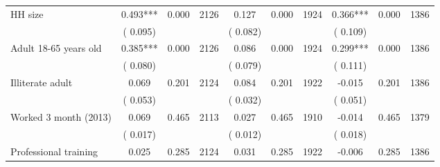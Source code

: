 \begin{tabular}{l*{9}{c}}
 HH size                 &              0.493***          &        0.000 & 2126          &              0.127 &        0.000 & 1924                   &        0.366*** &        0.000 & 1386                                 \\ 
                               &        (       0.095) & &                                                                 &       (       0.082) & &                                                          &       (       0.109) & &                                          \\ 
 Adult 18-65 years old                 &              0.385***          &        0.000 & 2126          &              0.086 &        0.000 & 1924                   &        0.299*** &        0.000 & 1386                                 \\ 
                               &        (       0.080) & &                                                                 &       (       0.079) & &                                                          &       (       0.111) & &                                          \\ 
 Illiterate adult                 &              0.069          &        0.201 & 2124          &              0.084 &        0.201 & 1922                   &       -0.015 &        0.201 & 1386                                 \\ 
                               &        (       0.053) & &                                                                 &       (       0.032) & &                                                          &       (       0.051) & &                                          \\ 
 Worked 3 month (2013)                 &              0.069          &        0.465 & 2113          &              0.027 &        0.465 & 1910                   &       -0.014 &        0.465 & 1379                                 \\ 
                               &        (       0.017) & &                                                                 &       (       0.012) & &                                                          &       (       0.018) & &                                          \\ 
 Professional training                 &              0.025          &        0.285 & 2124          &              0.031 &        0.285 & 1922                   &       -0.006 &        0.285 & 1386                                 \\ 

\end{tabular}
